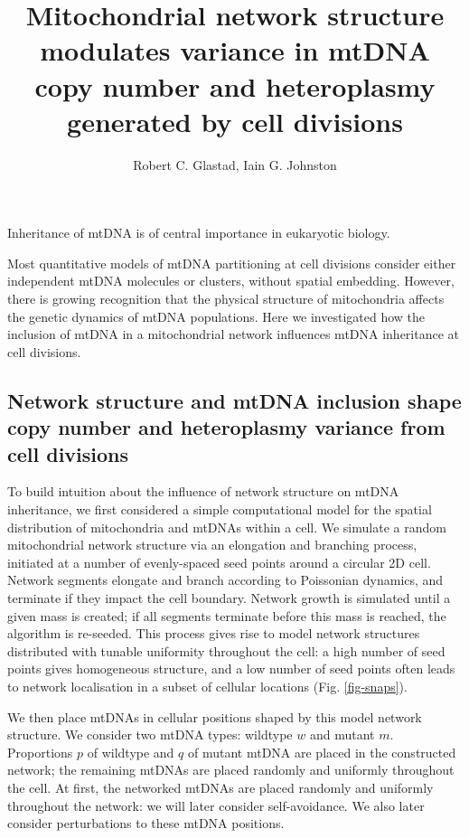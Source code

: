 \documentclass{article}
\title{Mitochondrial network structure modulates variance in mtDNA copy number and heteroplasmy generated by cell divisions}
\author{Robert C. Glastad, Iain G. Johnston}
\date{}
\begin{document}
\maketitle

Inheritance of mtDNA is of central importance in eukaryotic biology.

Most quantitative models of mtDNA partitioning at cell divisions consider either independent mtDNA molecules or clusters, without spatial embedding. However, there is growing recognition that the physical structure of mitochondria affects the genetic dynamics of mtDNA populations. Here we investigated how the inclusion of mtDNA in a mitochondrial network influences mtDNA inheritance at cell divisions.



\subsection*{Network structure and mtDNA inclusion shape copy number and heteroplasmy variance from cell divisions}

To build intuition about the influence of network structure on mtDNA inheritance, we first considered a simple computational model for the spatial distribution of mitochondria and mtDNAs within a cell. We simulate a random mitochondrial network structure via an elongation and branching process, initiated at a number of evenly-spaced seed points around a circular 2D cell. Network segments elongate and branch according to Poissonian dynamics, and terminate if they impact the cell boundary. Network growth is simulated until a given mass is created; if all segments terminate before this mass is reached, the algorithm is re-seeded. This process gives rise to model network structures distributed with tunable uniformity throughout the cell: a high number of seed points gives homogeneous structure, and a low number of seed points often leads to network localisation in a subset of cellular locations (Fig. \ref{fig-snaps}).

We then place mtDNAs in cellular positions shaped by this model network structure. We consider two mtDNA types: wildtype $w$ and mutant $m$. Proportions $p$ of wildtype and $q$ of mutant mtDNA are placed in the constructed network; the remaining mtDNAs are placed randomly and uniformly throughout the cell. At first, the networked mtDNAs are placed randomly and uniformly throughout the network: we will later consider self-avoidance. We also later consider perturbations to these mtDNA positions.
\end{document}
